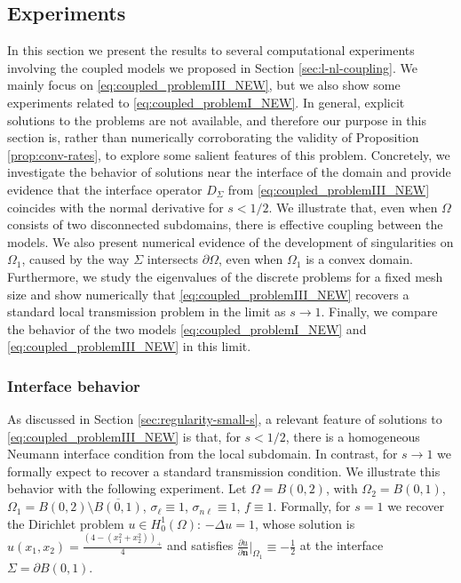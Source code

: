 \documentclass{amsart}
\newcommand{\Ol}{\Omega_{1}}%
\newcommand{\Onl}{\Omega_{2}}%
\renewcommand{\sl}{{\sigma_\ell}}
\newcommand{\snl}{{\sigma_{n\ell}}}
\def\vn{{\mathbf n}}
\theoremstyle{plain}
\numberwithin{equation}{section}
\numberwithin{table}{section}
\numberwithin{figure}{section}
\numberwithin{theorem}{section}
\numberwithin{corollary}{section}
\numberwithin{definition}{section}
\numberwithin{lemma}{section}
\numberwithin{proposition}{section}
\numberwithin{remark}{section}
\begin{document}
\subsection{Experiments}
In this section we present the results to several computational experiments involving the coupled models we proposed in Section \ref{sec:l-nl-coupling}.
We mainly focus on \eqref{eq:coupled_problemIII_NEW}, but we also show some experiments related to \eqref{eq:coupled_problemI_NEW}. In general, explicit solutions to the problems are not available, and therefore our purpose in this section is, rather than numerically corroborating the validity of Proposition \ref{prop:conv-rates}, to explore some salient features of this problem. 
Concretely, we investigate the behavior of solutions near the interface of the domain and provide evidence that the interface operator $ D_\Sigma $ from \eqref{eq:coupled_problemIII_NEW} coincides with the normal derivative for $s < 1/2$. We illustrate that, even when $ \Omega $ consists of two disconnected subdomains, there is effective coupling between the models. We also present numerical evidence of the development of singularities on $\Ol $, caused by the way $\Sigma$ intersects $\partial \Omega$, even when $\Ol$ is a convex domain. Furthermore, we study the eigenvalues of the discrete problems for a fixed mesh size and show numerically that \eqref{eq:coupled_problemIII_NEW} recovers a standard local transmission problem in the limit as $ s \to 1 $. Finally, we compare the behavior of the two models \eqref{eq:coupled_problemI_NEW} and \eqref{eq:coupled_problemIII_NEW} in this limit.

\subsubsection{Interface behavior} \label{sec:two-balls-experiment}
As discussed in Section \ref{sec:regularity-small-s}, a relevant feature of solutions to \eqref{eq:coupled_problemIII_NEW} is that, for $s<1/2$, there is a homogeneous Neumann interface condition from the local subdomain. In contrast, for $s \to 1$ we formally expect to recover a standard transmission condition. We illustrate this behavior with the following experiment.
Let $\Omega = B(0,2)$, with $\Onl = B(0,1)$, $\Ol = B(0,2) \setminus \overline{B(0,1)}$, $\sl \equiv 1$, $\snl \equiv 1$, $f \equiv 1$. Formally, for $s=1$ we recover the Dirichlet problem $u \in H^1_0(\Omega)$: $-\Delta u = 1$, whose solution is $u(x_1,x_2) = \frac{(4-(x_1^2+x_2^2))_+}4$ and satisfies ${\frac{\partial u}{\partial \vn}}|_{\Ol} \equiv -\frac12$ at the interface $\Sigma = \partial B(0,1)$.
\end{document}
